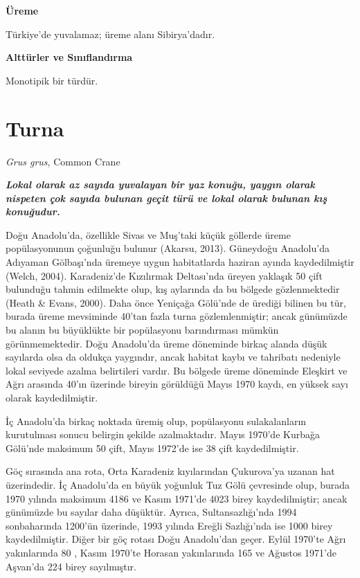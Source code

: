 \documentclass[
  a4paper,
  DIV=11,
  numbers=noendperiod]{scrreprt}
\begin{document}
\textbf{Üreme}

Türkiye'de yuvalamaz; üreme alanı Sibirya'dadır.

\textbf{Alttürler ve Sınıflandırma}

Monotipik bir türdür.

\section{Turna}\label{turna}

\emph{Grus grus}, Common Crane

\textbf{\emph{Lokal olarak az sayıda yuvalayan bir yaz konuğu, yaygın
olarak nispeten çok sayıda bulunan geçit türü ve lokal olarak bulunan
kış konuğudur.}}

Doğu Anadolu'da, özellikle Sivas ve Muş'taki küçük göllerde üreme
popülasyonunun çoğunluğu bulunur (Akarsu, 2013). Güneydoğu Anadolu'da
Adıyaman Gölbaşı'nda üremeye uygun habitatlarda haziran ayında
kaydedilmiştir (Welch, 2004). Karadeniz'de Kızılırmak Deltası'nda üreyen
yaklaşık 50 çift bulunduğu tahmin edilmekte olup, kış aylarında da bu
bölgede gözlenmektedir (Heath \& Evans, 2000). Daha önce Yeniçağa
Gölü'nde de ürediği bilinen bu tür, burada üreme mevsiminde 40'tan fazla
turna gözlemlenmiştir; ancak günümüzde bu alanın bu büyüklükte bir
popülasyonu barındırması mümkün görünmemektedir. Doğu Anadolu'da üreme
döneminde birkaç alanda düşük sayılarda olsa da oldukça yaygındır, ancak
habitat kaybı ve tahribatı nedeniyle lokal seviyede azalma belirtileri
vardır. Bu bölgede üreme döneminde Eleşkirt ve Ağrı arasında 40'ın
üzerinde bireyin görüldüğü Mayıs 1970 kaydı, en yüksek sayı olarak
kaydedilmiştir.

İç Anadolu'da birkaç noktada üremiş olup, popülasyonu sulakalanların
kurutulması sonucu belirgin şekilde azalmaktadır. Mayıs 1970'de Kurbağa
Gölü'nde maksimum 50 çift, Mayıs 1972'de ise 38 çift kaydedilmiştir.

Göç sırasında ana rota, Orta Karadeniz kıyılarından Çukurova'ya uzanan
hat üzerindedir. İç Anadolu'da en büyük yoğunluk Tuz Gölü çevresinde
olup, burada 1970 yılında maksimum 4186 ve Kasım 1971'de 4023 birey
kaydedilmiştir; ancak günümüzde bu sayılar daha düşüktür. Ayrıca,
Sultansazlığı'nda 1994 sonbaharında 1200'ün üzerinde, 1993 yılında
Ereğli Sazlığı'nda ise 1000 birey kaydedilmiştir. Diğer bir göç rotası
Doğu Anadolu'dan geçer. Eylül 1970'te Ağrı yakınlarında 80 , Kasım
1970'te Horasan yakınlarında 165 ve Ağustos 1971'de Aşvan'da 224 birey
sayılmıştır.
\end{document}
